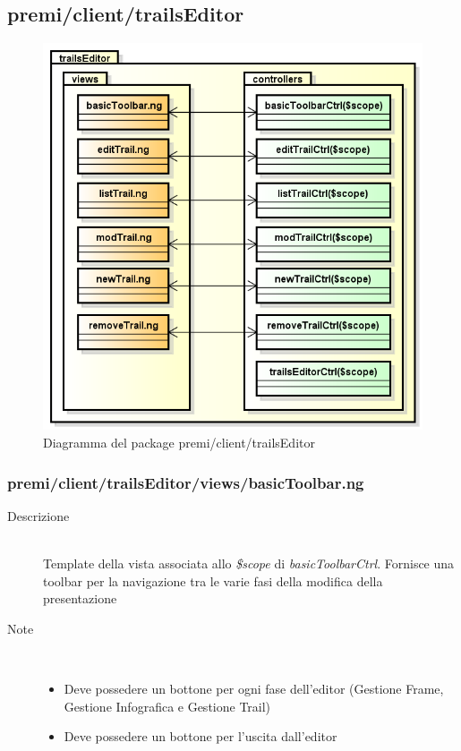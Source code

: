 \clearpage
\subsection{premi/client/trailsEditor}
\begin{figure}[h]
\begin{center}
\includegraphics[scale=0.55]{img/diapkg/trailsEditor.png}
\caption{Diagramma del package premi/client/trailsEditor}
\end{center}
\end{figure}

\subsubsection{premi/client/trailsEditor/views/basicToolbar.ng}

\begin{description}
\item[Descrizione] \hfill \\
	Template della vista associata allo \textit{\$scope} di \textit{basicToolbarCtrl}. Fornisce una toolbar per la navigazione tra le varie fasi della modifica della presentazione
\item[Note] \hfill \\
	\begin{itemize}
			\item Deve possedere un bottone per ogni fase dell'editor (Gestione Frame, Gestione Infografica e Gestione Trail)
			\item Deve possedere un bottone per l'uscita dall'editor
	\end{itemize}
\end{description}

